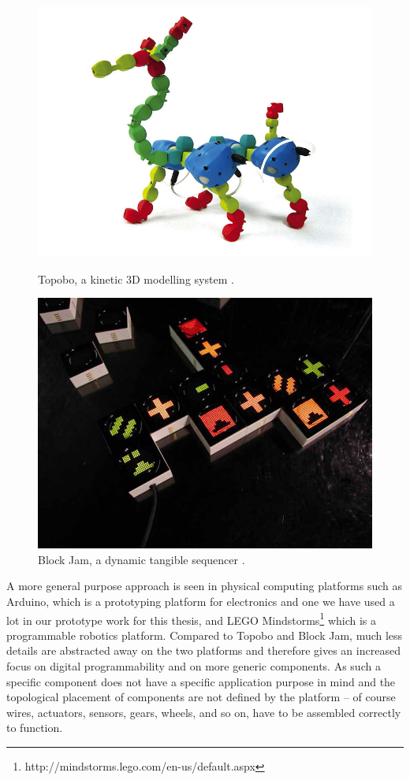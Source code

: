 \begin{figure}[h]
\centering
\begin{minipage}[t]{.45\textwidth}
  \centering
  \includegraphics[width=.9\linewidth]{figures/proto3/topobo}
  \caption{Topobo, a kinetic 3D modelling system \citep{raffle2004topobo}.}
  \label{topobo}
\end{minipage}%
\hspace{0.2cm}
\begin{minipage}[t]{.45\textwidth}
  \centering
  \includegraphics[width=.9\linewidth]{figures/proto3/blockjam}
  \caption{Block Jam, a dynamic tangible sequencer \citep{newton2003block}.}
  \label{blockjam}
\end{minipage}
\end{figure}

A more general purpose approach is seen in physical computing platforms such as Arduino, which is a prototyping platform for electronics and one we have used a lot in our prototype work for this thesis, and LEGO Mindstorms\footnote{http://mindstorms.lego.com/en-us/default.aspx} which is a programmable robotics platform.
Compared to Topobo and Block Jam, much less details are abstracted away on the two platforms and therefore gives an increased focus on digital programmability and on more generic components.
As such a specific component does not have a specific application purpose in mind and the topological placement of components are not defined by the platform -- of course wires, actuators, sensors, gears, wheels, and so on, have to be assembled correctly to function.

